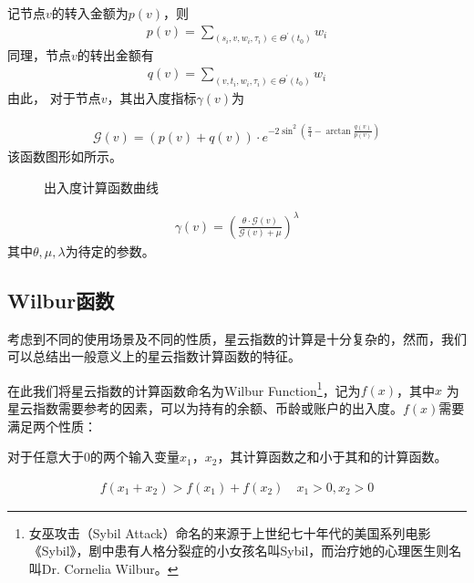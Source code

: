 
记节点$v$的转入金额为$p(v)$，则
\begin{align}
p(v) = \sum_{(s_i, v, w_i, \tau_i) \in \Theta^{\prime}(t_0)}{w_i}
\end{align}
\noindent 同理，节点$v$的转出金额有
\begin{align}
q(v) = \sum_{(v, t_i, w_i, \tau_i) \in \Theta^{\prime}(t_0)}{w_i}
\end{align}
\noindent 由此，
对于节点$v$，其出入度指标$\gamma(v)$为

\begin{align}
\mathcal{G}(v) = (p(v) + q(v)) \cdot e^{-2\sin^2{(\frac{\pi}{4} - \arctan\frac{q(v)}{p(v)})}}
\end{align}
\noindent 该函数图形如所示。
\begin{figure}
  \centering
  
\caption{出入度计算函数曲线 \label{fig-surf}}
\end{figure}

\begin{align}
\gamma(v) = (\frac{\theta\cdot \mathcal{G}(v)}{\mathcal{G}(v) + \mu})^{\lambda}
\end{align}
\noindent 其中$\theta, \mu, \lambda$为待定的参数。


\subsection{Wilbur函数 \label{sec:function}}
考虑到不同的使用场景及不同的性质，星云指数的计算是十分复杂的，然而，我们可以总结出一般意义上的星云指数计算函数的特征。

在此我们将星云指数的计算函数命名为Wilbur Function\footnote{女巫攻击（Sybil Attack）命名的来源于上世纪七十年代的美国系列电影《Sybil》，剧中患有人格分裂症的小女孩名叫Sybil，而治疗她的心理医生则名叫Dr. Cornelia Wilbur。}，记为\(f(x)\)，其中\(x\)
为星云指数需要参考的因素，可以为持有的余额、币龄或账户的出入度。$f(x)$需要满足两个性质：

\begin{property}
\label{prop:one}
对于任意大于$0$的两个输入变量$x_1$，$x_2$，其计算函数之和小于其和的计算函数。
\end{property}

\begin{align}
f(x_1+x_2)>f(x_1)+f(x_2) \quad x_1>0,x_2>0
\end{align}

